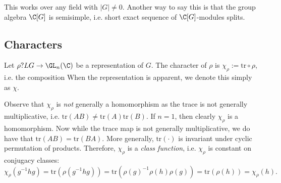 \begin{rem}
This works over any field with $|G| \neq 0$. Another way to say this is that the group algebra $\C[G]$ is semisimple, i.e. short exact sequence of $\C[G]$-modules splits. 
\end{rem}



\subsection{Characters}

\begin{dfn}[Character]
Let $\rho?L G \to \GL_n(\C)$ be a representation of $G$. The character of $\rho$ is $\chi_\rho:= \text{tr}\circ \rho$, i.e. the composition
When the representation is apparent, we denote this simply as $\chi$.
\end{dfn}


Observe that $\chi_\rho$ is \emph{not} generally a homomorphism as the trace is not generally multiplicative, i.e. $\text{tr}(AB) \neq \text{tr}(A)\text{tr}(B)$. If $n=1$, then clearly $\chi_\rho$ is a homomorphism. Now while the trace map is not generally multiplicative, we do have that $\text{tr}(AB)=\text{tr}(BA)$. More generally, $\text{tr}(\cdot)$ is invariant under cyclic permutation of products. Therefore, $\chi_\rho$ is a \emph{class function}, i.e. $\chi_\rho$ is constant on conjugacy classes:
	\[
	\chi_\rho(g^{-1}hg)= \text{tr}(\rho(g^{-1}hg))=\text{tr}(\rho(g)^{-1}\rho(h)\rho(g))= \text{tr}(\rho(h))=\chi_\rho(h).
	\]


